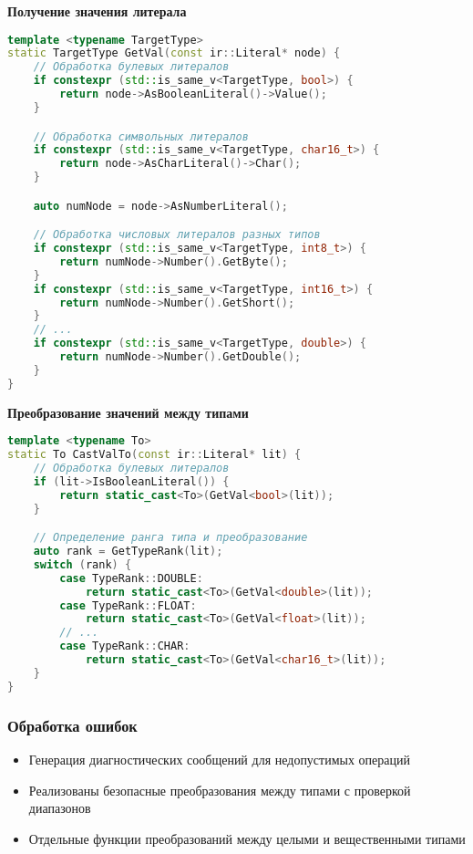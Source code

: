 \textbf{Получение значения литерала}
\begin{lstlisting}[language=C++,caption=GetVal]
template <typename TargetType>
static TargetType GetVal(const ir::Literal* node) {
    // Обработка булевых литералов
    if constexpr (std::is_same_v<TargetType, bool>) {
        return node->AsBooleanLiteral()->Value();
    }

    // Обработка символьных литералов
    if constexpr (std::is_same_v<TargetType, char16_t>) {
        return node->AsCharLiteral()->Char();
    }

    auto numNode = node->AsNumberLiteral();

    // Обработка числовых литералов разных типов
    if constexpr (std::is_same_v<TargetType, int8_t>) {
        return numNode->Number().GetByte();
    }
    if constexpr (std::is_same_v<TargetType, int16_t>) {
        return numNode->Number().GetShort();
    }
    // ...
    if constexpr (std::is_same_v<TargetType, double>) {
        return numNode->Number().GetDouble();
    }
}
\end{lstlisting}

\textbf{Преобразование значений между типами}
\begin{lstlisting}[language=C++,caption=CastValTo]
template <typename To>
static To CastValTo(const ir::Literal* lit) {
    // Обработка булевых литералов
    if (lit->IsBooleanLiteral()) {
        return static_cast<To>(GetVal<bool>(lit));
    }

    // Определение ранга типа и преобразование
    auto rank = GetTypeRank(lit);
    switch (rank) {
        case TypeRank::DOUBLE:
            return static_cast<To>(GetVal<double>(lit));
        case TypeRank::FLOAT:
            return static_cast<To>(GetVal<float>(lit));
        // ...
        case TypeRank::CHAR:
            return static_cast<To>(GetVal<char16_t>(lit));
    }
}
\end{lstlisting}


\subsubsection*{Обработка ошибок}
\begin{itemize}[label={--}]
    \item Генерация диагностических сообщений для недопустимых операций
    \item Реализованы безопасные преобразования между типами с проверкой диапазонов
    \item Отдельные функции преобразований между целыми и вещественными типами
\end{itemize}

